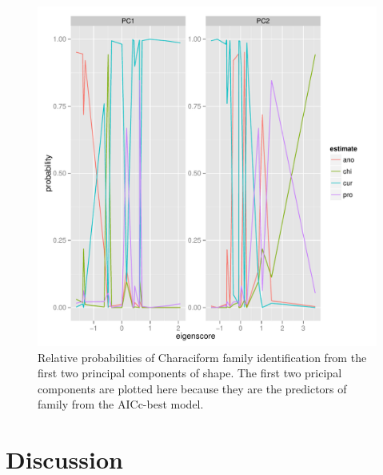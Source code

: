 \documentclass{article}\usepackage{graphicx, color}
\begin{document}
\begin{figure}[p]
  \centering
  \includegraphics[height = 0.5\textheight, keepaspectratio = true]{figure/logistic-plots}
  \caption{Relative probabilities of Characiform family identification from the first two principal components of shape. The first two pricipal components are plotted here because they are the predictors of family from the AICc-best model.}
  \label{fig:fish-logistic}
\end{figure}


\section{Discussion}
\end{document}
